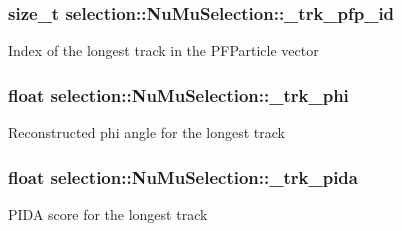 \subsubsection[{\texorpdfstring{\+\_\+trk\+\_\+pfp\+\_\+id}{_trk_pfp_id}}]{\setlength{\rightskip}{0pt plus 5cm}size\+\_\+t selection\+::\+Nu\+Mu\+Selection\+::\+\_\+trk\+\_\+pfp\+\_\+id\hspace{0.3cm}{\ttfamily [private]}}\hypertarget{classselection_1_1NuMuSelection_acbc163e95eec5a3bbbf3648480737a56}{}\label{classselection_1_1NuMuSelection_acbc163e95eec5a3bbbf3648480737a56}
Index of the longest track in the P\+F\+Particle vector 
\subsubsection[{\texorpdfstring{\+\_\+trk\+\_\+phi}{_trk_phi}}]{\setlength{\rightskip}{0pt plus 5cm}float selection\+::\+Nu\+Mu\+Selection\+::\+\_\+trk\+\_\+phi\hspace{0.3cm}{\ttfamily [private]}}\hypertarget{classselection_1_1NuMuSelection_aeb0b180b3bbe753b576c4db2fa3f94af}{}\label{classselection_1_1NuMuSelection_aeb0b180b3bbe753b576c4db2fa3f94af}
Reconstructed phi angle for the longest track 
\subsubsection[{\texorpdfstring{\+\_\+trk\+\_\+pida}{_trk_pida}}]{\setlength{\rightskip}{0pt plus 5cm}float selection\+::\+Nu\+Mu\+Selection\+::\+\_\+trk\+\_\+pida\hspace{0.3cm}{\ttfamily [private]}}\hypertarget{classselection_1_1NuMuSelection_ae2b400954b0bce9930437be4fdb7fd85}{}\label{classselection_1_1NuMuSelection_ae2b400954b0bce9930437be4fdb7fd85}
P\+I\+DA score for the longest track 
